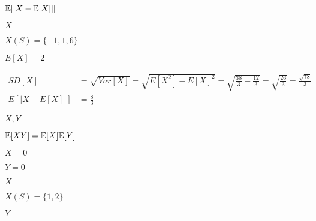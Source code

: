 \documentclass[10pt]{book}
\begin{document}
\begin{mdSnippets}
\begin{mdInlineSnippet}[b62b9c1a6d38dcb32555f53fa998d7f3]
$\mathbb{E}[ | X - \mathbb{E}[X] | ]$\end{mdInlineSnippet}%
\begin{mdInlineSnippet}[02129bb861061d1a052c592e2dc6b383]%
$X$\end{mdInlineSnippet}%
\begin{mdInlineSnippet}[a950ca257a1c51ece387d939d3c1f269]%
$X(S) = \{-1,1,6\}$\end{mdInlineSnippet}%
\begin{mdInlineSnippet}[8638254592b7816c817b5fd0cfcbf1bf]%
$E[X] = 2$\end{mdInlineSnippet}%
\begin{mdDisplaySnippet}[59f64e35b8317a54e95d42669a866231]%
\[%
\begin{aligned}
SD[X] &= \sqrt{Var[X]} = \sqrt{E[X^2] - E[X]^2} = \sqrt{\frac{38}{3} - \frac{12}{3}} = 
\sqrt{\frac{26}{3}} = \frac{\sqrt{78}}{3} \\
E[|X -E[X]|] &= \frac{8}{3}
\end{aligned}
\]%
\end{mdDisplaySnippet}%
\begin{mdInlineSnippet}[d23a4ce8bca0f4891e037439a79b45a6]%
$X,Y$\end{mdInlineSnippet}%
\begin{mdInlineSnippet}[b9893c2a1f6c2f68c9e03010a6ebb3f2]%
$\mathbb{E}[XY] = \mathbb{E}[X]\mathbb{E}[Y]$\end{mdInlineSnippet}%
\begin{mdInlineSnippet}%
$X = 0$\end{mdInlineSnippet}%
\begin{mdInlineSnippet}[59f03c061be46a8564bc3ba06b56ff23]%
$Y = 0$\end{mdInlineSnippet}%
\begin{mdInlineSnippet}[02129bb861061d1a052c592e2dc6b383]%
$X$\end{mdInlineSnippet}%
\begin{mdInlineSnippet}[010ac4b713debffe565e65b74a086839]%
$X(S) = \{1,2\}$\end{mdInlineSnippet}%
\begin{mdInlineSnippet}[57cec4137b614c87cb4e24a3d003a3e0]%
$Y$\end{mdInlineSnippet}%

\end{mdSnippets}
\end{document}
